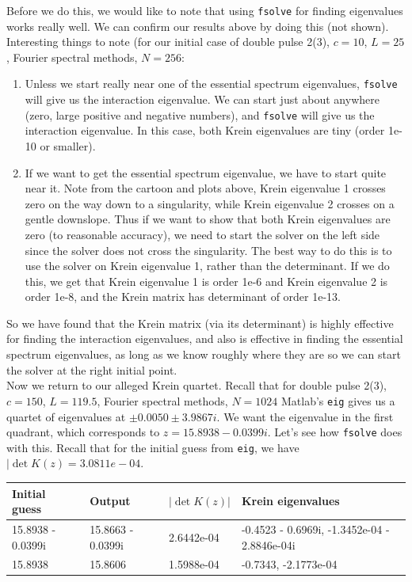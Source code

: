 \documentclass[12pt]{article}
\begin{document}
Before we do this, we would like to note that using \texttt{fsolve} for finding eigenvalues works really well. We can confirm our results above by doing this (not shown). Interesting things to note (for our initial case of double pulse 2(3), $c = 10$, $L = 25$, Fourier spectral methods, $N = 256$:
\begin{enumerate}
	\item Unless we start really near one of the essential spectrum eigenvalues, \texttt{fsolve} will give us the interaction eigenvalue. We can start just about anywhere (zero, large positive and negative numbers), and \texttt{fsolve} will give us the interaction eigenvalue. In this case, both Krein eigenvalues are tiny (order 1e-10 or smaller).
	\item If we want to get the essential spectrum eigenvalue, we have to start quite near it. Note from the cartoon and plots above, Krein eigenvalue 1 crosses zero on the way down to a singularity, while Krein eigenvalue 2 crosses on a gentle downslope. Thus if we want to show that both Krein eigenvalues are zero (to reasonable accuracy), we need to start the solver on the left side since the solver does not cross the singularity. The best way to do this is to use the solver on Krein eigenvalue 1, rather than the determinant. If we do this, we get that Krein eigenvalue 1 is order 1e-6 and Krein eigenvalue 2 is order 1e-8, and the Krein matrix has determinant of order 1e-13.
\end{enumerate} 

So we have found that the Krein matrix (via its determinant) is highly effective for finding the interaction eigenvalues, and also is effective in finding the essential spectrum eigenvalues, as long as we know roughly where they are so we can start the solver at the right initial point.\\

Now we return to our alleged Krein quartet. Recall that for double pulse 2(3), $c = 150$, $L = 119.5$, Fourier spectral methods, $N = 1024$ Matlab's \texttt{eig} gives us a quartet of eigenvalues at $\pm 0.0050 \pm 3.9867i$. We want the eigenvalue in the first quadrant, which corresponds to $z = 15.8938 - 0.0399i$. Let's see how \texttt{fsolve} does with this. Recall that for the initial guess from \texttt{eig}, we have $|\det K(z) =  3.0811e-04$.

\begin{table}[H]
\begin{tabular}{l|lll}
Initial guess & Output & $|\det K(z)|$ & Krein eigenvalues \\ \hline
15.8938 - 0.0399i & 15.8663 - 0.0399i & 2.6442e-04 & -0.4523 - 0.6969i, -1.3452e-04 - 2.8846e-04i \\
15.8938 & 15.8606 & 1.5988e-04 & -0.7343, -2.1773e-04 \\
\end{tabular}
\end{table}
\end{document}
